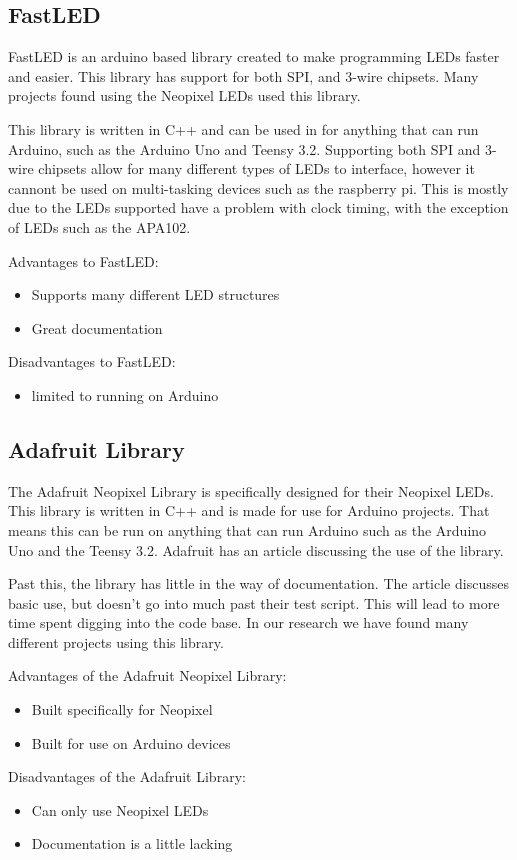 \documentclass[onecolumn, draftclsnofoot,10pt, compsoc]{IEEEtran}
\begin{document}
		\subsection{FastLED}
		\noindent FastLED is an arduino based library created to make programming
		LEDs faster and easier. This library has support for both SPI, and 3-wire
		chipsets\cite[Pg 7]{fastLED}. Many projects found using the Neopixel LEDs
		used this library.

		\vspace{5mm}
		\noindent This library is written in C++ and can be used in for anything
		that can run Arduino, such as the Arduino Uno and Teensy 3.2. Supporting
		both SPI and 3-wire chipsets allow for many different types of LEDs to
		interface, however it cannont be used on multi-tasking devices such as the
		raspberry pi. This is mostly due to the LEDs supported have a problem with
		clock timing, with the exception of LEDs such as the APA102.

		\vspace{5mm}
		\noindent Advantages to FastLED:
		\begin{itemize}
			\item Supports many different LED structures
			\item Great documentation
		\end{itemize}
		Disadvantages to FastLED:
		\begin{itemize}
			\item limited to running on Arduino
		\end{itemize}
		\subsection{Adafruit Library}
		\noindent The Adafruit Neopixel Library is specifically designed for their Neopixel
		LEDs. This library is written in C++ and is made for use for Arduino
		projects. That means this can be run on anything that can run Arduino such
		as the Arduino Uno and the Teensy 3.2. Adafruit has an article discussing
		the use of the library\cite[Pg 7]{neolib}.


		\vspace{5mm}
		\noindent Past this, the library has little in the way of documentation. The article
		discusses basic use, but doesn't go into much past their test script. This
		will lead to more time spent digging into the code base. In our research we
		have found many different projects using this library.

		\vspace{5mm}
		\noindent Advantages of the Adafruit Neopixel Library:
		\begin{itemize}
			\item Built specifically for Neopixel
			\item Built for use on Arduino devices
		\end{itemize}
		Disadvantages of the Adafruit Library:
		\begin{itemize}
			\item Can only use Neopixel LEDs
			\item Documentation is a little lacking
		\end{itemize}
\end{document}
